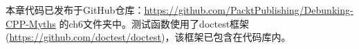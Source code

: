 本章代码已发布于GitHub仓库：\url{https://github.com/PacktPublishing/Debunking-CPP-Myths} 的ch6文件夹中。测试函数使用了doctest框架(\url{https://github.com/doctest/doctest})，该框架已包含在代码库内。